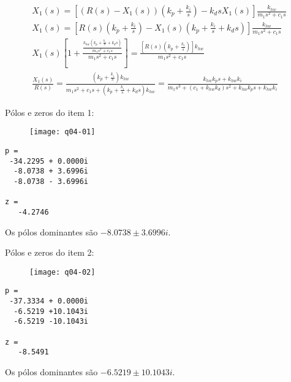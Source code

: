 \documentclass[a4paper,11pt]{article}
\begin{document}
\begin{gather*}
    X_1\left(s\right) = \left[\left(R\left(s\right) - X_1\left(s\right)\right)
        \left(k_p + \frac{k_i}{s}\right) - k_d s X_1\left(s\right)\right]
        \frac{k_{hw}}{m_1 s^2 + c_1 s} \\
    X_1\left(s\right) = \left[R\left(s\right)
        \left(k_p + \frac{k_i}{s}\right) - X_1\left(s\right)
        \left(k_p + \frac{k_i}{s} + k_d s\right)\right]
        \frac{k_{hw}}{m_1 s^2 + c_1 s} \\
    X_1\left(s\right) \left[1 +
        \frac{\frac{k_{hw} \left(k_p + \frac{k_i}{s} + k_d s\right)}
        {m_1 s^2 + c_1 s}}{m_1 s^2 + c_1 s}\right] = \frac{\left[R\left(s\right)
        \left(k_p + \frac{k_i}{s}\right)\right] k_{hw}}{m_1 s^2 + c_1 s} \\
    \frac{X_1\left(s\right)}{R\left(s\right)} = 
        \frac{\left(k_p + \frac{k_i}{s}\right) k_{hw}}
        {m_1 s^2 + c_1 s + \left(k_p + \frac{k_i}{s} + k_d s\right) k_{hw}} =
        \frac{k_{hw} k_p s + k_{hw} k_i}
        {m_1 s^3 + \left(c_1 + k_{hw} k_d\right) s^2 + k_{hw} k_p s +
        k_{hw} k_i}
\end{gather*}

\pagebreak

Pólos e zeros do item 1:

\begin{figure}[H]
\texttt{[image: q04-01]}
\centering
\end{figure}

\begin{lstlisting}
p =
 -34.2295 + 0.0000i
  -8.0738 + 3.6996i
  -8.0738 - 3.6996i

z =
   -4.2746
\end{lstlisting}

Os pólos dominantes são $-8.0738 \pm 3.6996i$.

\pagebreak

Pólos e zeros do item 2:

\begin{figure}[H]
\texttt{[image: q04-02]}
\centering
\end{figure}

\begin{lstlisting}
p =
 -37.3334 + 0.0000i
  -6.5219 +10.1043i
  -6.5219 -10.1043i

z =
   -8.5491
\end{lstlisting}

Os pólos dominantes são $-6.5219 \pm 10.1043i$.
\end{document}
